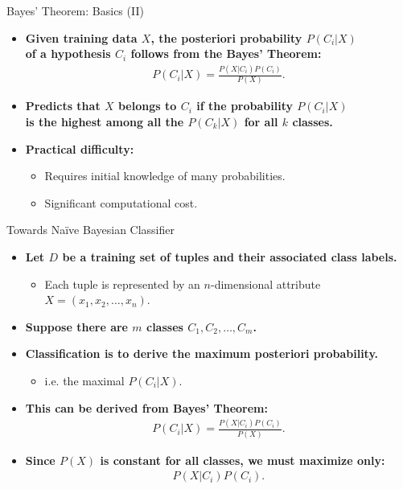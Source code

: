 \begin{frame}{Bayes' Theorem: Basics (II)}
	\begin{itemize}
		\item \textbf{Given training data $X$, the posteriori probability $P(C_i|X)$\\
			      of a hypothesis $C_i$ follows from the Bayes' Theorem:}
		      \begin{align*}
			      P(C_i|X) = \frac{P(X|C_i)P(C_i)}{P(X)}.
		      \end{align*}
		\item \textbf{Predicts that $X$ belongs to $C_i$ if the probability $P(C_i|X)$\\
			      is {\color{airforceblue}the highest} among all the $P(C_k|X)$ for all $k$ classes.}
		\item \textbf{Practical difficulty:}
		      \begin{itemize}
			      \item Requires initial knowledge of many probabilities.
			      \item Significant computational cost.
		      \end{itemize}
	\end{itemize}
\end{frame}

\begin{frame}{Towards Naïve Bayesian Classifier}
	\begin{itemize}
		\item \textbf{Let $D$ be a training set of tuples and their associated class labels.}
		      \begin{itemize}
			      \item Each tuple is represented by an $n$-dimensional attribute $X = (x_1,x_2,\ldots,x_n)$.
		      \end{itemize}
		\item \textbf{Suppose there are $m$ classes $C_1,C_2, \ldots, C_m$.}
		\item \textbf{Classification is to derive the {\color{airforceblue}maximum posteriori probability}.}
		      \begin{itemize}
			      \item i.e. the maximal $P(C_i|X)$.
		      \end{itemize}
		\item \textbf{This can be derived from Bayes' Theorem:}
		      \begin{align*}
			      P(C_i|X) = \frac{P(X|C_i)P(C_i)}{P(X)}.
		      \end{align*}
		\item \textbf{Since $P(X)$ is constant for all classes, we must maximize only:}
		      \begin{align*}
			      P(X|C_i)P(C_i).
		      \end{align*}
	\end{itemize}
\end{frame}

